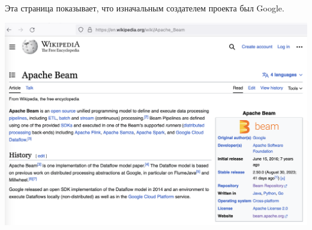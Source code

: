 
Эта страница показывает, что изначальным создателем проекта был Google.

\includegraphics[width=\textwidth]{beam-wikipedia}

\pagebreak
